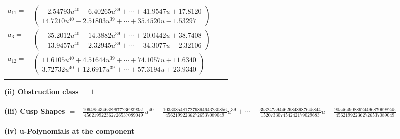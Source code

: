\documentclass[1p]{elsarticle_modified}
\theoremstyle{definition}
\begin{document}
\begin{tabular}{m{7pt} m{180pt} m{7pt} m{180pt} }
\flushright $a_{11}=$&$\begin{pmatrix}-2.54793 u^{40}+6.40265 u^{39}+\cdots+41.9547 u+17.8120\\14.7210 u^{40}-2.51803 u^{39}+\cdots+35.4520 u-1.53297\end{pmatrix}$ \\
\flushright $a_{3}=$&$\begin{pmatrix}-35.2012 u^{40}+14.3882 u^{39}+\cdots+20.0442 u+38.7408\\-13.9457 u^{40}+2.32945 u^{39}+\cdots-34.3077 u-2.32106\end{pmatrix}$ \\
\flushright $a_{12}=$&$\begin{pmatrix}11.6105 u^{40}+4.51644 u^{39}+\cdots+74.1057 u+11.6340\\3.72732 u^{40}+12.6917 u^{39}+\cdots+57.3194 u+23.9340\end{pmatrix}$\\&\end{tabular}
\flushleft \textbf{(ii) Obstruction class $= 1$}\\~\\
\flushleft \textbf{(iii) Cusp Shapes $= -\frac{1064854346389677236939351}{456219922362726537089049} u^{40}-\frac{10330854817279894643230856}{456219922362726537089049} u^{39}+\cdots-\frac{3932475944626848987645844}{152073307454242179029683} u-\frac{9054649088924496870698245}{456219922362726537089049}$}\\~\\
\newpage\renewcommand{\arraystretch}{1}
\flushleft \textbf{(iv) u-Polynomials at the component}\newline \\
\end{document}
